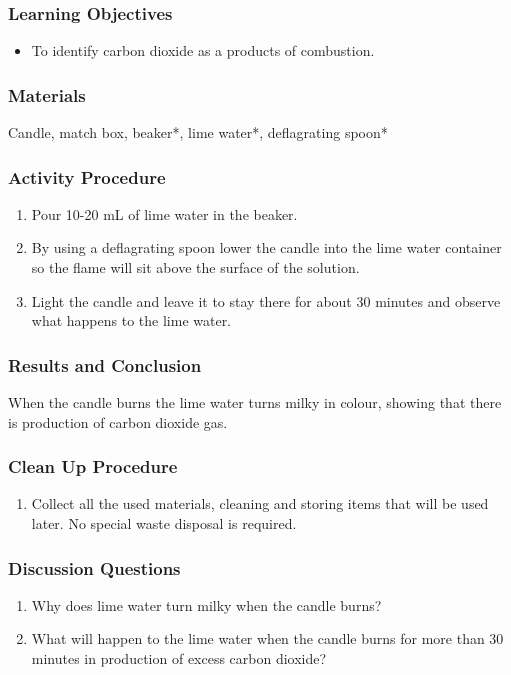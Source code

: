 \subsubsection*{Learning Objectives}
\begin{itemize}
\item{To identify carbon dioxide as a products of combustion.}
\end{itemize}

\subsubsection*{Materials}
Candle, match box, beaker*, lime water*, deflagrating spoon*

\subsubsection*{Activity Procedure}
\begin{enumerate}
\item{Pour 10-20 mL of lime water in the beaker.}
\item{By using a deflagrating spoon lower the candle into the lime water container so the flame will sit above the surface of the solution.}
\item{Light the candle and leave it to stay there for about 30 minutes and observe what happens to the lime water.}
\end{enumerate}

\subsubsection*{Results and Conclusion}
When the candle burns the lime water turns milky in colour, showing that there is production of carbon dioxide gas.

\subsubsection*{Clean Up Procedure}
\begin{enumerate}
\item{Collect all the used materials, cleaning and storing items that will be used later. No special waste disposal is required.}
\end{enumerate}

\subsubsection*{Discussion Questions}
\begin{enumerate}
\item{Why does lime water turn milky when the candle burns?}
\item{What will happen to the lime water when the candle burns for more than 30 minutes in production of excess carbon dioxide?}
\end{enumerate}

